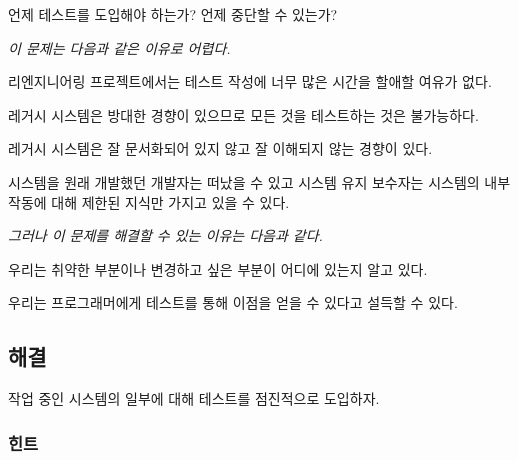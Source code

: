 \documentclass[a4paper,10pt,twoside]{book}
\begin{document}
언제 테스트를 도입해야 하는가? 언제 중단할 수 있는가?

\emph{이 문제는 다음과 같은 이유로 어렵다.}

\begin{bulletlist}
\item 리엔지니어링 프로젝트에서는 테스트 작성에 너무 많은 시간을 할애할 여유가 없다.
\item 레거시 시스템은 방대한 경향이 있으므로 모든 것을 테스트하는 것은 불가능하다.
\item 레거시 시스템은 잘 문서화되어 있지 않고 잘 이해되지 않는 경향이 있다.
\item 시스템을 원래 개발했던 개발자는 떠났을 수 있고 시스템 유지 보수자는 시스템의 내부 작동에 대해 제한된 지식만 가지고 있을 수 있다.
\end{bulletlist}

\emph{그러나 이 문제를 해결할 수 있는 이유는 다음과 같다.}

\begin{bulletlist}
\item 우리는 취약한 부분이나 변경하고 싶은 부분이 어디에 있는지 알고 있다.
\item 우리는 프로그래머에게 테스트를 통해 이점을 얻을 수 있다고 설득할 수 있다.
\end{bulletlist}

\subsection*{해결}

작업 중인 시스템의 일부에 대해 테스트를 점진적으로 도입하자.

\subsubsection*{힌트}
\end{document}
